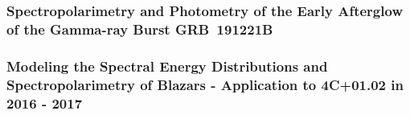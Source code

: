 \subsubsection{Spectropolarimetry and Photometry of the Early Afterglow of the Gamma-ray Burst GRB~191221B\hfill\mbox{\citep{Buckley191221B}}}


\subsubsection{Modeling the Spectral Energy Distributions and Spectropolarimetry of Blazars - Application to 4C+01.02 in 2016 - 2017\hfill\citep{Schutte4C0102}}


